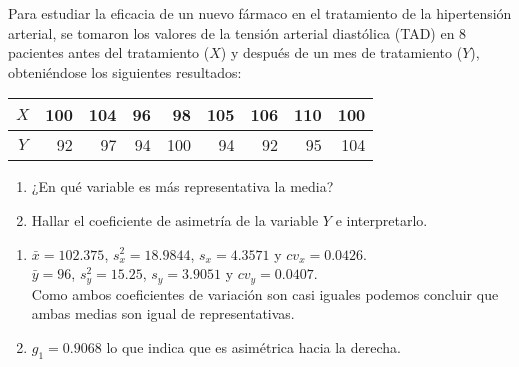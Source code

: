 {Para  estudiar la eficacia de un nuevo fármaco en el tratamiento de la hipertensión arterial, se tomaron los valores
de la tensión arterial diastólica (TAD) en 8 pacientes antes del tratamiento ($X$) y después de un mes de tratamiento
($Y$), obteniéndose los siguientes resultados:
\begin{center}
\begin{tabular}{|c|r|r|r|r|r|r|r|r|}
\hline
$X$ & 100 & 104 & 96 & 98 & 105 & 106 & 110 & 100 \\
\hline
$Y$ & 92 & 97 & 94 & 100 & 94 & 92 & 95 & 104 \\
\hline
\end{tabular}
\end{center}

\begin{enumerate}
\item ¿En qué variable es más representativa la media?
\item Hallar el coeficiente de asimetría de la variable $Y$ e interpretarlo.
\end{enumerate}
}
{\begin{enumerate}
\item $\bar x=102.375$, $s_x^2=18.9844$, $s_x=4.3571$ y $cv_x =0.0426$.\\
$\bar y=96$, $s_y^2=15.25$, $s_y=3.9051$ y $cv_y = 0.0407$.\\
Como ambos coeficientes de variación son casi iguales podemos concluir que ambas medias son igual de representativas.
\item $g_1=0.9068$ lo que indica que es asimétrica hacia la derecha.
\end{enumerate}
}
